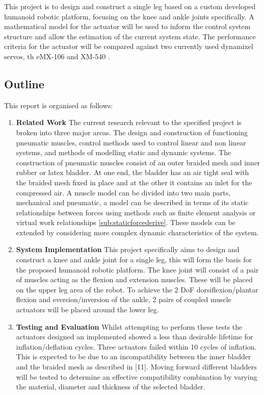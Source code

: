 \documentclass[11pt,a4paper]{article}
\begin{document}
This project is to design and construct a single leg based on a custom developed humanoid robotic platform, focusing on the knee and ankle joints specifically. A mathematical model for the actuator will be used to inform the control system structure and allow the estimation of the current system state. The performance criteria for the actuator will be compared against two currently used dynamixel servos, th eMX-106 \cite{robotis_mx106} and XM-540 \cite{robotis}.

\newpage
\subsection{Outline}
\label{sub:outline}
This report is organised as follows:
\begin{enumerate}
\item \textbf{Related Work} The current research relevant to the specified project is broken into three major areas. The design and construction of functioning pneumatic muscles, control methods used to control linear and non linear systems, and methods of modelling static and dynamic systems. The construction of pneumatic muscles consist of an outer braided mesh and inner rubber or latex bladder. At one end, the bladder has an air tight seal with the braided mesh fixed in place and at the other it contains an inlet for the compressed air. A muscle model can be divided into two main parts, mechanical and pneumatic, a model can be described in terms of its static relationships between forces using methods such as finite element analysis or virtual work relationships \cref{sub:staticforcederive}. These models can be extended by considering more complex dynamic characteristics of the system.
\item \textbf{System Implementation} This project specifically aims to design and construct a knee and ankle joint for a single leg, this will form the basis for the proposed humanoid robotic platform. The knee joint will consist of a pair of muscles acting as the flexion and extension muscles.  These will be placed on the upper leg area of the robot. To achieve the 2 DoF dorsiflexion/plantar flexion and eversion/inversion of the ankle, 2 pairs of coupled muscle actuators will be placed around the lower leg.
\item \textbf{Testing and Evaluation} Whilst attempting to perform these tests the actuators designed an implemented showed  a  less  than  desirable  lifetime  for  inflation/deflation  cycles.   Three  actuators failed within 10 cycles of inflation.  This is expected to be due to an incompatibility between the inner bladder and the braided mesh as described in [11].  Moving forward different  bladders  will  be  tested  to  determine  an  effective  compatibility  combination by  varying  the  material,  diameter  and  thickness  of  the  selected  bladder.

\end{enumerate}
\end{document}
